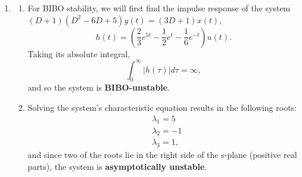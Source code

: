 \documentclass{article}
\begin{document}
\begin{enumerate}[label=\thesubsubsection]
\begin{enumerate}[label=\alph*)]
\begin{enumerate}[label=(\roman*)]
\[									\]
									and so the system is \textit{BIBO-unstable}. 
								\item Analyzing the characteristic roots for asymptotic stability, 
									\begin{align*}
										& \lambda_1, \lambda_2 = 0 \\
										& \lambda_3 = j \sqrt{2} \\
										& \lambda_4 = -j \sqrt{2}.
									\end{align*}
									Since there are repeated roots on the imaginary axis, we consider this system \textbf{asymptotically unstable}, which matches our prior assessment of BIBO-instability.
							\end{enumerate}
						\item 
							\begin{enumerate}[label=(\roman*)]
								\item For BIBO stability, we will first find the impulse response of the system \((D + 1)(D^2-6D+5)y(t) = (3D+1)x(t)\), 
									\[
										h(t) = (\frac{2}{3}e^{5t}-\frac{1}{2}e^t-\frac{1}{6}e^{-t})u(t).
									\]
									Taking its absolute integral,
									\[
									  \int_{0}^{\infty}|h(\tau)|d\tau = \infty,
									\]
									and so the system is \textbf{BIBO-unstable}.
									\item
										Solving the system's characteristic equation results in the following roots: 
										\begin{align*}
											& \lambda_1 = 5\\
											& \lambda_2 = -1\\
											& \lambda_3 = 1,
										\end{align*}
										and since two of the roots lie in the right side of the s-plane (positive real parts), the system is \textbf{asymptotically unstable}.
							\end{enumerate}
					\end{enumerate}
\end{enumerate}
\end{document}
